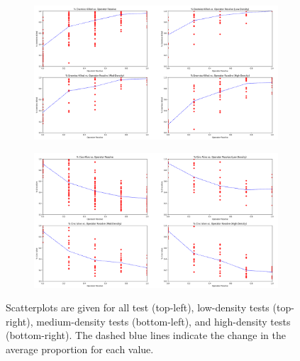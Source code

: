 \documentclass[letterpaper,11pt]{article}
\begin{document}
	\begin{figure}[p]
		\begin{subfigure}[t]{\textwidth}
			\centering
			\includegraphics[width=\linewidth]{figures/ScatPlotsOptrsEnemies}
			\label{fig:ScatPlotsOptrsEnemies}
		\end{subfigure}
		\begin{subfigure}[b]{\textwidth}
			\centering
			\includegraphics[width=\linewidth]{figures/ScatPlotsOptrsCivs}
			\label{fig:ScatPlotsOptrsCivs}
		\end{subfigure}
		\caption{Scatterplots are given for all test (top-left), low-density tests (top-right), medium-density tests (bottom-left), and high-density tests (bottom-right). The dashed blue lines indicate the change in the average proportion for each value.}
		\label{fig:ScatPlotsOptrs}
	\end{figure}

	\pagebreak
	
	
\end{document}
